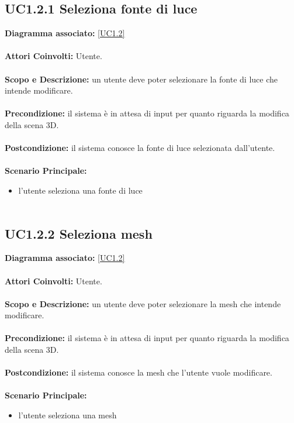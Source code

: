 \subsection{UC1.2.1 Seleziona fonte di luce}
\textbf{Diagramma associato:}
\ref{UC1.2} \\ \\
\textbf{Attori Coinvolti:}
Utente. \\ \\
\textbf{Scopo e Descrizione:}
un utente deve poter selezionare la fonte di luce che intende modificare. \\ \\
\textbf{Precondizione:}
il sistema è in attesa di input  per quanto riguarda la modifica della scena 3D. \\ \\
\textbf{Postcondizione:}
il sistema conosce la fonte di luce selezionata dall'utente. \\ \\
\textbf{Scenario Principale:}
\begin{itemize}
\item l'utente seleziona una fonte di luce
\\ \\ \end{itemize}


\subsection{UC1.2.2 Seleziona mesh}
\textbf{Diagramma associato:}
\ref{UC1.2} \\ \\
\textbf{Attori Coinvolti:}
Utente. \\ \\
\textbf{Scopo e Descrizione:}
un utente deve poter selezionare la mesh che intende modificare. \\ \\
\textbf{Precondizione:}
il sistema è in attesa di input  per quanto riguarda la modifica della scena 3D. \\ \\
\textbf{Postcondizione:}
il sistema conosce la mesh che l'utente vuole modificare. \\ \\
\textbf{Scenario Principale:}
\begin{itemize}
\item l'utente seleziona una mesh
\\ \\ \end{itemize}


